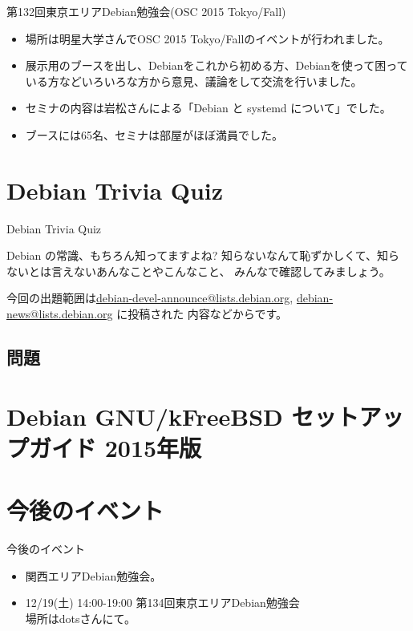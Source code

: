 \begin{frame}{第132回東京エリアDebian勉強会(OSC 2015 Tokyo/Fall)}

 \begin{itemize}
\item 場所は明星大学さんでOSC 2015 Tokyo/Fallのイベントが行われました。
\item 展示用のブースを出し、Debianをこれから初める方、Debianを使って困っている方などいろいろな方から意見、議論をして交流を行いました。
\item セミナの内容は岩松さんによる「Debian と systemd について」でした。
\item ブースには65名、セミナは部屋がほぼ満員でした。
\end{itemize} 
  
\end{frame}

\section{Debian Trivia Quiz}
\begin{frame}{Debian Trivia Quiz}

  Debian の常識、もちろん知ってますよね?
知らないなんて恥ずかしくて、知らないとは言えないあんなことやこんなこと、
みんなで確認してみましょう。

今回の出題範囲は\url{debian-devel-announce@lists.debian.org},
\url{debian-news@lists.debian.org} に投稿された
内容などからです。

\end{frame}

\subsection{問題}



\section{Debian GNU/kFreeBSD セットアップガイド 2015年版}

\section{今後のイベント}
\begin{frame}{今後のイベント}
\begin{itemize}
\item 関西エリアDebian勉強会。
\item 12/19(土) 14:00-19:00 第134回東京エリアDebian勉強会\\
  場所はdotsさんにて。
\end{itemize}
\end{frame}

